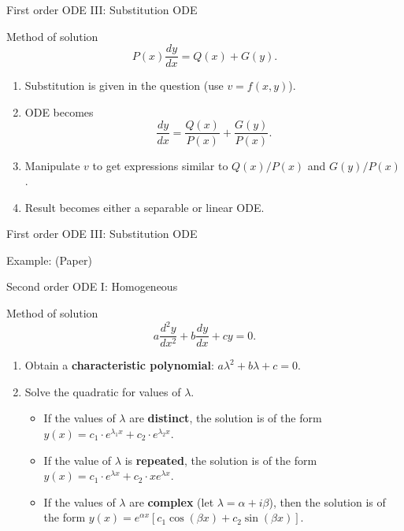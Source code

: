 \begin{frame}{First order ODE III: Substitution ODE}
    \begin{block}{Method of solution}
    \[ P(x) \frac{dy}{dx} = Q(x) + G(y).\]
    \pause
    \begin{enumerate}
        \item Substitution is given in the question (use \(v = f(x, y)\)). \pause
        
        \item ODE becomes \[ \frac{dy}{dx} = \frac{Q(x)}{P(x)} + \frac{G(y)}{P(x)}.\] \pause
        
        \item Manipulate \(v\) to get expressions similar to \(Q(x)/P(x)\) and \(G(y)/P(x)\). \pause
        
        \item Result becomes either a separable or linear ODE.
    \end{enumerate}
    \end{block}
\end{frame}

\begin{frame}{First order ODE III: Substitution ODE}
    \begin{exampleblock}{Example: (Paper)}
    \end{exampleblock}
\end{frame}

\begin{frame}{Second order ODE I: Homogeneous}
    \begin{block}{Method of solution}
    \[ a\frac{d^2y}{dx^2} + b\frac{dy}{dx} + cy = 0.\]
    \pause
    \begin{enumerate}
        \item Obtain a \textbf{characteristic polynomial}: \(\displaystyle a\lambda^2 + b\lambda + c = 0.\) \pause
        
        \item Solve the quadratic for values of \(\lambda\). \pause
        
        \begin{itemize}
            \item If the values of \(\lambda\) are \textbf{distinct}, the solution is of the form \(y(x) = c_1 \cdot e^{\lambda_1 x} + c_2 \cdot e^{\lambda_2 x}\). \pause
            
            \item If the value of \(\lambda\) is \textbf{repeated}, the solution is of the form \(\displaystyle y(x) = c_1 \cdot e^{\lambda x} + c_2 \cdot xe^{\lambda x}\). \pause
            
            \item If the values of \(\lambda\) are \textbf{complex} (let \(\lambda = \alpha + i\beta\)), then the solution is of the form \(\displaystyle y(x) = e^{\alpha x}\left[c_1\cos(\beta x) + c_2\sin(\beta x)\right]\).
        \end{itemize}
    \end{enumerate}
    \end{block}
\end{frame}

